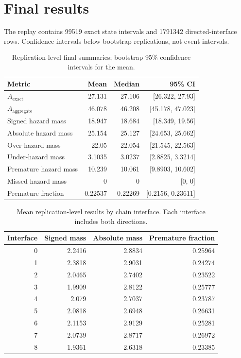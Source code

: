 \documentclass[11pt]{article}
\begin{document}
\section{Final results}
The replay contains 99519 exact state intervals and 1791342 directed-interface rows. Confidence intervals below bootstrap replications, not event intervals.
\begin{table}[H]\centering
\caption{Replication-level final summaries; bootstrap 95\% confidence intervals for the mean.}
\begin{tabular}{lrrr}\toprule
Metric & Mean & Median & 95\% CI \\\midrule
$A_{\mathrm{exact}}$ & 27.131 & 27.106 & [26.322, 27.93] \\
$A_{\mathrm{aggregate}}$ & 46.078 & 46.208 & [45.178, 47.023] \\
Signed hazard mass & 18.947 & 18.684 & [18.349, 19.56] \\
Absolute hazard mass & 25.154 & 25.127 & [24.653, 25.662] \\
Over-hazard mass & 22.05 & 22.054 & [21.545, 22.563] \\
Under-hazard mass & 3.1035 & 3.0237 & [2.8825, 3.3214] \\
Premature hazard mass & 10.239 & 10.061 & [9.8903, 10.602] \\
Missed hazard mass & 0 & 0 & [0, 0] \\
Premature fraction & 0.22537 & 0.22269 & [0.2156, 0.23611] \\
\bottomrule\end{tabular}\end{table}

\begin{table}[H]\centering
\caption{Mean replication-level results by chain interface. Each interface includes both directions.}
\begin{tabular}{rrrr}\toprule
Interface & Signed mass & Absolute mass & Premature fraction \\\midrule
0 & 2.2416 & 2.8834 & 0.25964 \\
1 & 2.3818 & 2.9031 & 0.24274 \\
2 & 2.0465 & 2.7402 & 0.23522 \\
3 & 1.9909 & 2.8122 & 0.25777 \\
4 & 2.079 & 2.7037 & 0.23787 \\
5 & 2.0818 & 2.6948 & 0.26631 \\
6 & 2.1153 & 2.9129 & 0.25281 \\
7 & 2.0739 & 2.8717 & 0.26972 \\
8 & 1.9361 & 2.6318 & 0.23385 \\
\bottomrule\end{tabular}\end{table}
\end{document}
